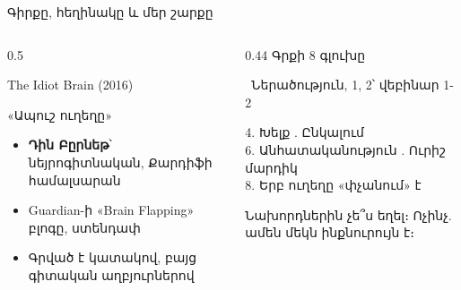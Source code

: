 \begin{frame}{Գիրքը, հեղինակը և մեր շարքը}
  \begin{columns}[T]
    \begin{column}{0.5\textwidth}
      \begin{card}
        {\blackfont\Large The Idiot Brain} {\small (2016)}\par
        «Ապուշ ուղեղը»\par\medskip
        \begin{itemize}
          \item \textbf{Դին Բըրնեթ}՝ նեյրոգիտնական, Քարդիֆի համալսարան
          \item Guardian-ի «Brain Flapping» բլոգը, ստենդափ
          \item Գրված է կատակով, բայց գիտական աղբյուրներով
        \end{itemize}
        \vspace{-1mm}
      \end{card}
    \end{column}
    \begin{column}{0.44\textwidth}
      {\blackfont\small Գրքի 8 գլուխը}\par\smallskip
      {\color{plum!55!cream}\small {}\ Ներածություն, 1, 2՝ վեբինար 1-2}\par\smallskip
      \par\smallskip
      {\color{plum!55!cream}\small
      4. Խելք . Ընկալում\\
      6. Անհատականություն . Ուրիշ մարդիկ\\
      8. Երբ ուղեղը «փչանում» է}\par\smallskip
      \begin{card}[colback=mint!35!cardwhite]
        Նախորդներին չե՞ս եղել։ Ոչինչ. ամեն մեկն ինքնուրույն է։
      \end{card}
    \end{column}
  \end{columns}
\end{frame}

